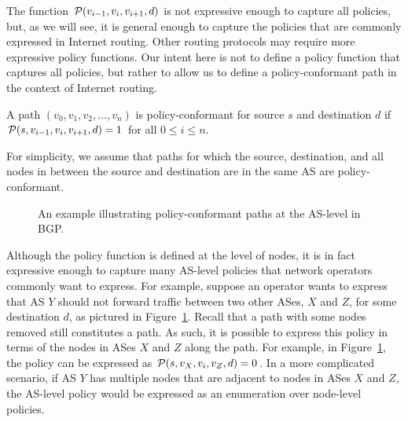The function $\P(v_{i-1}, v_i, v_{i+1}, d)$ is not expressive enough to
capture all policies, but, as we will see, it is general enough to
capture the policies that are commonly expressed in Internet
routing.  Other routing protocols may require more expressive
policy functions. Our intent here is not to define a policy function
that captures all policies, but rather to allow us to define a
policy-conformant path in the context of Internet routing.


\begin{defn}\label{defn:pcp}
A path $(v_0, v_1, v_2, \ldots, v_n)$ is policy-conformant for source $s$
and destination 
$d$ if $\P(s, v_{i-1}, v_i, v_{i+1},d) = 1$ for all $0 \leq i \leq n$.
\end{defn}

\noindent
For simplicity, we assume that paths for which the source,
destination, and all nodes in between the source and destination are in
the same AS are policy-conformant.  
%

\begin{figure}
\centering
\begin{psfrags}
\end{psfrags}
\caption[Expressing policy-conformant paths at the AS-level in BGP.]{An example
  illustrating policy-conformant paths at the AS-level in BGP.}
\label{fig:policy_ex}
\end{figure}


Although the policy function is defined at the level of nodes, it is in
fact expressive enough to capture many AS-level policies that network
operators commonly want to express.  For example, suppose an operator
wants to express that AS $Y$ should not forward traffic between two other
ASes, $X$ and $Z$, for some destination $d$, as
pictured in Figure~\ref{fig:policy_ex}.  Recall that a path with some
nodes removed still constitutes a path.  As such, it is possible 
to express this policy in terms of the nodes in ASes $X$ and $Z$
along the path.  For example, in Figure~\ref{fig:policy_ex}, the policy can be
expressed as $\P(s, v_X, v_i, v_Z, d) = 0$.  In a more complicated
scenario, if AS $Y$ has multiple nodes that are adjacent to nodes in
ASes $X$ and $Z$, the AS-level policy would be
expressed as an enumeration over node-level policies.



